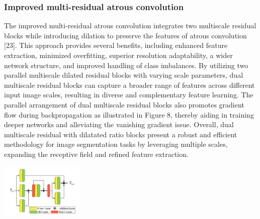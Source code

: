 \documentclass[conference]{IEEEtran}
\begin{document}
\subsubsection{Improved multi-residual atrous convolution}
The improved multi-residual atrous convolution integrates two multiscale residual blocks while introducing dilation to preserve the features of atrous convolution [23]. This approach provides several benefits, including enhanced feature extraction, minimized overfitting, superior resolution adaptability, a wider network structure, and improved handling of class imbalances. By utilizing two parallel multiscale dilated residual blocks with varying scale parameters, dual multiscale residual blocks can capture a broader range of features across different input image scales, resulting in diverse and complementary feature learning. The parallel arrangement of dual multiscale residual blocks also promotes gradient flow during backpropagation as illustrated in Figure 8, thereby aiding in training deeper networks and alleviating the vanishing gradient issue. Overall, dual multiscale residual with dilatated ratio blocks present a robust and efficient methodology for image segmentation tasks by leveraging multiple scales, expanding the receptive field and refined feature extraction. 
\centerline{\includegraphics[width=40mm,scale=0.5]{group/Picture9.png}}
\end{document}
